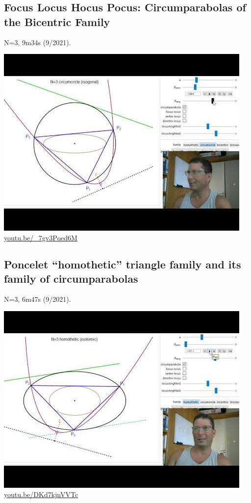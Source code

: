 \documentclass[12pt]{amsart}
\begin{document}
\subsection{Focus Locus Hocus Pocus: Circumparabolas of the Bicentric Family}
\label{vid:_7gv3Pqed6M}
\noindent N=3, 9m34s (9/2021). 
\begin{center}\includegraphics[width=.5\textwidth]{pics/_7gv3Pqed6M.jpg} \\ 
\href{https://youtu.be/_7gv3Pqed6M}{\url{youtu.be/\_7gv3Pqed6M}}\end{center}
% 

\subsection{Poncelet ``homothetic'' triangle family and its family of circumparabolas}
\label{vid:DKd7kjnVVTc}
\noindent N=3, 6m47s (9/2021). 
\begin{center}\includegraphics[width=.5\textwidth]{pics/DKd7kjnVVTc.jpg} \\ 
\href{https://youtu.be/DKd7kjnVVTc}{\url{youtu.be/DKd7kjnVVTc}}\end{center}
% 
\end{document}
